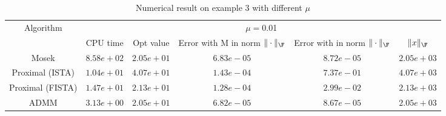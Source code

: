 \begin{table}
\centering
\begin{tabular}{|c|c|c|c|c|c|}

\hline
\multirow{2}{*}{ Algorithm} &\multicolumn{5}{c|}{$\mu=$0.01}\\\cline{2-6}
 &CPU time &Opt value &Error with M in norm $\|\cdot\|_\F$ &Error with in norm $\|\cdot\|_\F$ &$\|x\|_\F$\\\hline
Mosek & $8.58e+02$ & $2.05e+01$ & $6.83e-05$ & $8.72e-05$ & $2.05e+03$\\\hline
Proximal (ISTA) & $1.04e+01$ & $4.07e+01$ & $1.43e-04$ & $7.37e-01$ & $4.07e+03$\\\hline
Proximal (FISTA) & $1.47e+01$ & $2.13e+01$ & $1.28e-04$ & $2.99e-02$ & $2.13e+03$\\\hline
ADMM & $3.13e+00$ & $2.05e+01$ & $6.82e-05$ & $8.67e-05$ & $2.05e+03$\\\hline
\end{tabular}
\caption{Numerical result on example 3 with different $\mu$\label{example3}}
\end{table}
